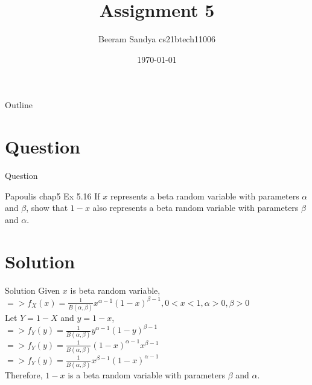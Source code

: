 \documentclass{beamer}
\title{Assignment 5}
\author{Beeram Sandya cs21btech11006}
\date{\today}
\begin{document}
\begin{frame}
    \titlepage 
\end{frame}

\logo{}


\begin{frame}{Outline}
    \tableofcontents
\end{frame}

\section{Question}
\begin{frame}{Question}
\begin{block}{Papoulis chap5 Ex 5.16 }
If $x$ represents a beta random variable with parameters $\alpha$ and $\beta$, show that $1-x$ also represents a beta random variable with parameters $\beta$ and $\alpha$.

\end{block}
\end{frame}

\section{Solution}
\begin{frame}{Solution}
Given $x$ is beta random variable,\\
$=>f_X(x) = \frac{1}{B(\alpha,\beta)}x^{\alpha - 1}(1 - x)^{\beta - 1},       0 < x < 1,  \alpha > 0,  \beta > 0$\\
Let $Y = 1 - X$ and $y = 1 - x$, \\
$=> f_Y(y) = \frac{1}{B(\alpha,\beta)}y^{\alpha - 1}(1-y)^{\beta - 1}$ \\
$=> f_Y(y) = \frac{1}{B(\alpha,\beta)}(1 - x)^{\alpha - 1}x^{\beta - 1}$ \\
$=> f_Y(y) = \frac{1}{B(\alpha,\beta)}x^{\beta - 1}(1 - x)^{\alpha - 1}$ \\
Therefore, $1 - x$ is a beta random variable with parameters $\beta$ and $\alpha$.

\end{frame} 
\end{document}
